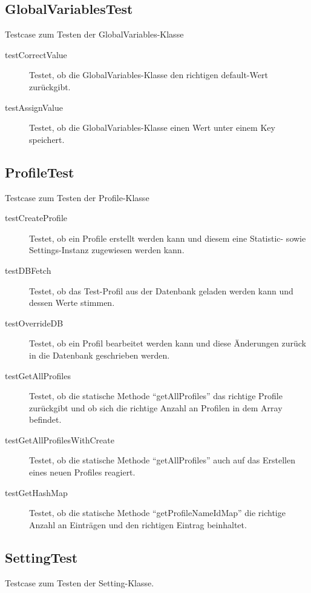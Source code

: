 \documentclass[parskip=full]{scrreprt}
\begin{document}
\subsection{GlobalVariablesTest}

Testcase zum Testen der GlobalVariables-Klasse

\begin{description} 
\item[testCorrectValue]
	Testet, ob die GlobalVariables-Klasse den richtigen default-Wert zurückgibt.
\item[testAssignValue]
	Testet, ob die GlobalVariables-Klasse einen Wert unter einem Key speichert.
\end{description}

\subsection{ProfileTest}

Testcase zum Testen der Profile-Klasse

\begin{description}
	\item[testCreateProfile] Testet, ob ein Profile erstellt werden kann und diesem eine Statistic- sowie Settings-Instanz zugewiesen werden kann.
	\item[testDBFetch] Testet, ob das Test-Profil aus der Datenbank geladen werden kann und dessen Werte stimmen.
	\item[testOverrideDB] Testet, ob ein Profil bearbeitet werden kann und diese Änderungen zurück in die Datenbank geschrieben werden.
	\item[testGetAllProfiles] Testet, ob die statische Methode \enquote{getAllProfiles} das richtige Profile zurückgibt und ob sich die richtige Anzahl an Profilen in dem Array befindet.
	\item[testGetAllProfilesWithCreate] Testet, ob die statische Methode \enquote{getAllProfiles} auch auf das Erstellen eines neuen Profiles reagiert.
	\item[testGetHashMap] Testet, ob die statische Methode \enquote{getProfileNameIdMap} die richtige Anzahl an Einträgen und den richtigen Eintrag beinhaltet.
\end{description}

\subsection{SettingTest}

Testcase zum Testen der Setting-Klasse.
\end{document}
